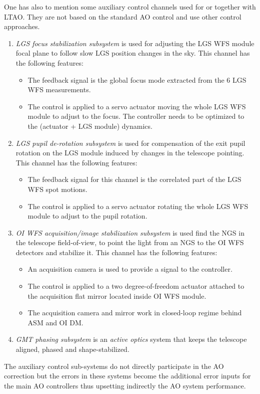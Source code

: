 One has also to mention some auxiliary control channels used for or together
with LTAO. They are not based on the standard AO control and use other control
approaches.
\begin{enumerate}
	\item \emph{LGS focus stabilization subsystem}  is used for adjusting the LGS WFS
	module focal plane to follow slow LGS position changes in the sky. This
	channel has the following features:
	\begin{itemize}
		\item The feedback signal is the global focus mode extracted from the 6
		LGS WFS measurements.
		\item The control is applied to a servo actuator moving the whole LGS WFS
		module to adjust to the focus. The controller needs to be optimized to the
		(actuator + LGS module) dynamics.
	\end{itemize}
	\item \emph{LGS pupil de-rotation subsystem}  is used for compensation of the exit
	pupil rotation on the LGS module induced by changes in the telescope pointing.
	This channel has the following features:
	\begin{itemize}
		\item The feedback signal for this channel is the correlated part of the
		LGS WFS spot motions.
		\item The control is applied to a servo actuator rotating the whole LGS
		WFS module to adjust to the pupil rotation.
	\end{itemize}
	\item \emph{OI WFS acquisition/image stabilization subsystem}  is used find the NGS
	in the telescope field-of-view, to point the light from an NGS to the
	OI WFS detectors and stabilize it. This channel has the following features:
	\begin{itemize}
		\item An acquisition camera is used to provide a signal to the controller.
		\item The control is applied to a two degree-of-freedom actuator attached
		to the acquisition flat mirror located inside OI WFS module.
		\item The acquisition camera and mirror work in closed-loop regime behind
		ASM and OI DM.
	\end{itemize}
	\item \emph{GMT phasing subsystem}  is an
	\emph{active optics} system that keeps the telescope aligned, phased and
	shape-stabilized.
\end{enumerate}
The auxiliary control sub-systems do not directly participate in the AO
correction but the errors in these systems become the additional error inputs
for the main AO controllers thus upsetting indirectly the AO system
performance.

